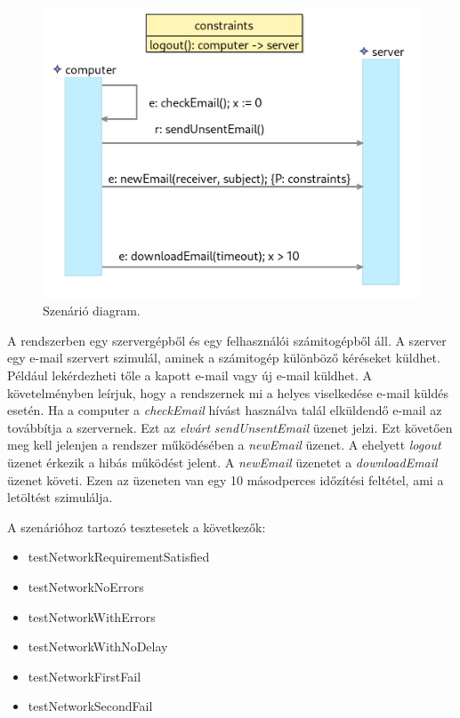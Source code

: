 \begin{figure}[!ht]
    \centering
    \includegraphics[width=150mm, keepaspectratio]{figures/diagramExample.png}
    \caption{Szenárió diagram.}
\end{figure}

A rendszerben egy szervergépből és egy felhasználói számitogépből áll.
A szerver egy e-mail szervert szimulál, aminek a számitogép különböző kéréseket küldhet.
Például lekérdezheti tőle a kapott e-mail vagy új e-mail küldhet.
A követelményben leírjuk, hogy a rendszernek mi a helyes viselkedése e-mail küldés esetén.
Ha a computer a \textit{checkEmail} hívást használva talál elküldendő e-mail az továbbítja a szervernek.
Ezt az \textit{elvárt} \textit{sendUnsentEmail} üzenet jelzi.
Ezt követően meg kell jelenjen a rendszer működésében a \textit{newEmail} üzenet.
A ehelyett \textit{logout} üzenet érkezik a hibás működést jelent.
A \textit{newEmail} üzenetet a \textit{downloadEmail} üzenet követi.
Ezen az üzeneten van egy 10 másodperces időzítési feltétel, ami a letöltést szimulálja.

A szenárióhoz tartozó tesztesetek a következők:

\begin{itemize}
    \item testNetworkRequirementSatisfied
    \item testNetworkNoErrors
    \item testNetworkWithErrors
    \item testNetworkWithNoDelay
    \item testNetworkFirstFail
    \item testNetworkSecondFail
\end{itemize}

